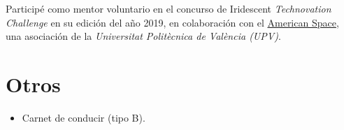 \documentclass[letterpaper, 12pt]{article}
\newcommand{\uni}{\emph{Universitat Politècnica de València (UPV)}}
\begin{document}
    Participé como mentor voluntario en el concurso de Iridescent \emph{Technovation Challenge} en su edición del año 2019, en colaboración con el \href{https://cdl.upv.es/american-space}{American Space}, una asociación de la \uni.

    \section{Otros}

    \begin{itemize}
        \item Carnet de conducir (tipo B).
    \end{itemize}
\end{document}

